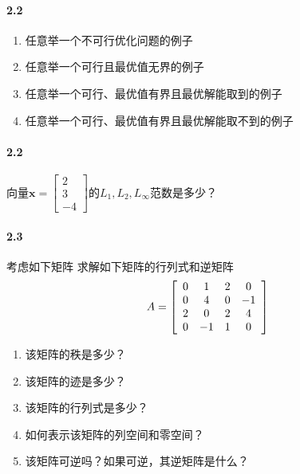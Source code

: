 \documentclass[12pt,a4paper]{article}
\begin{document}
	\paragraph{2.2}
    	\begin{enumerate}
		\item 任意举一个不可行优化问题的例子
		\item 任意举一个可行且最优值无界的例子
		\item 任意举一个可行、最优值有界且最优解能取到的例子
        \item 任意举一个可行、最优值有界且最优解能取不到的例子
	\end{enumerate}
	
	
	\paragraph{2.2}
	向量$\mathbf{x}= \left[\begin{array}{c} 2  \\3 \\ -4 \end{array}\right]$的$L_1, L_2,  L_{\infty}$范数是多少？
	
	
	\paragraph{2.3}
	考虑如下矩阵
	求解如下矩阵的行列式和逆矩阵
	$$A= \left[\begin{array}{c c c c}
	0 & 1& 2 & 0 \\0 & 4 & 0 &-1 \\ 2 & 0 & 2 &4\\0 & -1 & 1 &0
	\end{array}\right]$$
	\begin{enumerate}
		\item 该矩阵的秩是多少？
		\item 该矩阵的迹是多少？
		\item 该矩阵的行列式是多少？
		\item 如何表示该矩阵的列空间和零空间？
		\item 该矩阵可逆吗？如果可逆，其逆矩阵是什么？
	\end{enumerate}
	
	
\end{document}
